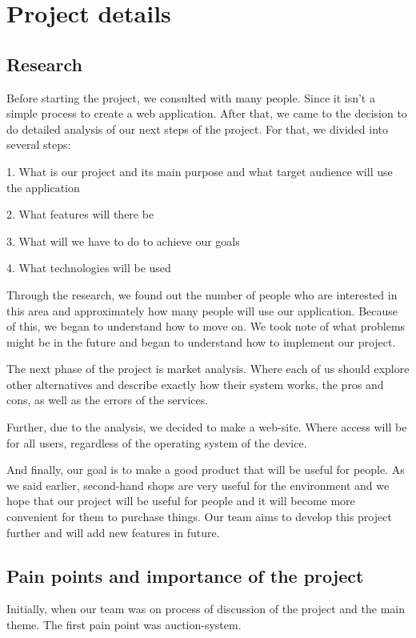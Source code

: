 \chapter{Project details}\label{ch:A}
\section{Research}
Before starting the project, we consulted with many people. Since it isn't a simple process to create a web application. After that, we came to the decision to do detailed analysis of our next steps of the project. For that, we divided into several steps:
    
    1. What is our project and its main purpose and what target audience will use the application
    
    2. What features will there be 

    3. What will we have to do to achieve our goals

    4. What technologies will be used

Through the research, we found out the number of people who are interested in this area and approximately how many people will use our application. Because of this, we began to understand how to move on. We took note of what problems might be in the future and began to understand how to implement our project.

The next phase of the project is market analysis. Where each of us should explore other alternatives and describe exactly how their system works, the pros and cons, as well as the errors of the services.

Further, due to the analysis, we decided to make a web-site. Where access will be for all users, regardless of the operating system of the device.

And finally, our goal is to make a good product that will be useful for people. As we said earlier, second-hand shops are very useful for the environment and we hope that our project will be useful for people and it will become more convenient for them to purchase things. Our team aims to develop this project further and will add new features in future.

\section{Pain points and importance of the project}
Initially, when our team was on process of discussion of the project and the main theme. The first pain point was auction-system.

